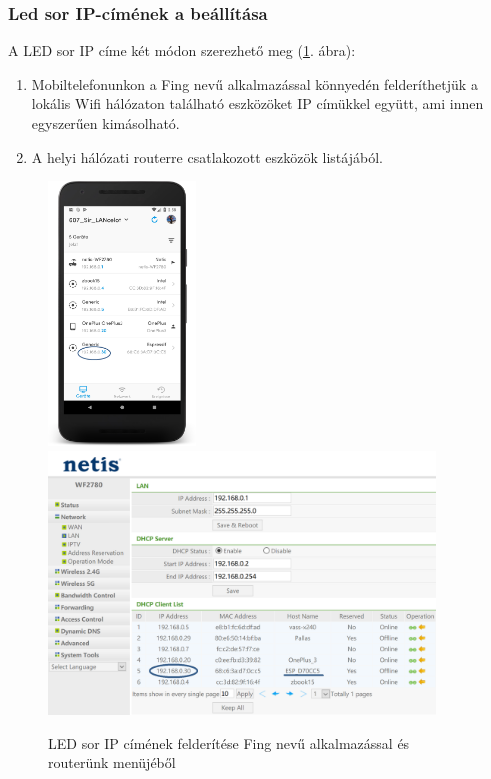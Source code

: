\documentclass[../main.tex]{subfiles}
\begin{document}
        \subsubsection{Led sor IP-címének a beállítása}
            A LED sor %
            IP címe két módon szerezhető meg (\ref{fig:ip_addres}. ábra):
            
            \begin{enumerate}
                \item Mobiltelefonunkon a Fing nevű alkalmazással könnyedén felderíthetjük a lokális Wifi hálózaton található eszközöket IP címükkel együtt, ami innen egyszerűen kimásolható.
                \item A helyi hálózati routerre csatlakozott eszközök listájából.
            \end{enumerate}
            
            \begin{figure}[!h]
                \includegraphics[height=7cm]{android_res/screen_pictures/ip_addr_fing}
                \includegraphics[height=7cm]{android_res/screen_pictures/ip_addr_router}
                \caption{LED sor IP címének felderítése Fing nevű alkalmazással és routerünk menüjéből}
                \label{fig:ip_addres}
            \end{figure}
\end{document}
